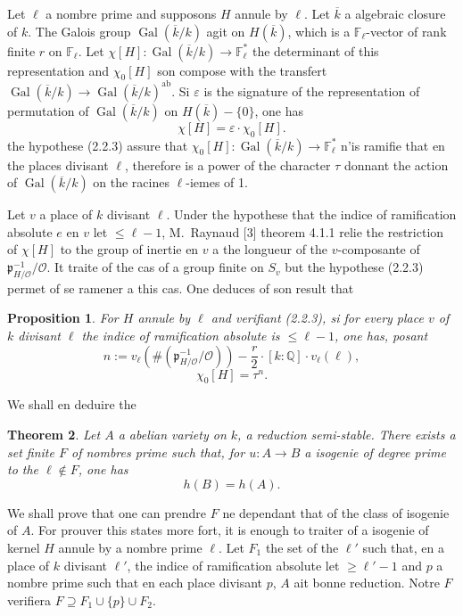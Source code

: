 \documentclass[12pt,a4paper]{article}
\theoremstyle{plain}
\newtheorem{theorem}{Theorem}[section]
\newtheorem{proposition}[theorem]{Proposition}
\theoremstyle{definition}
\theoremstyle{remark}
\DeclareMathOperator{\Gal}{Gal}
\newcommand{\QQ}{\mathbb{Q}}
\newcommand{\FF}{\mathbb{F}}
\newcommand{\cO}{\mathcal{O}}
\providecommand{\FF}{\mathbb{F}}
\providecommand{\QQ}{\mathbb{Q}}
\providecommand{\cO}{\mathcal{O}}
\providecommand{\Gal}{\operatorname{Gal}}
\providecommand{\fp}{\mathfrak{p}}
\begin{document}
Let $\ell$ a nombre prime and supposons $H$ annule by $\ell$. Let $\overline{k}$ a algebraic closure of $k$. The Galois group $\Gal(\overline{k}/k)$ agit on $H(\overline{k})$, which is a $\FF_\ell$-vector of rank finite $r$ on $\FF_\ell$. Let $\chi[H] : \Gal(\overline{k}/k) \to \FF_\ell^*$ the determinant of this representation and $\chi_0[H]$ son compose with the transfert $\Gal(\overline{k}/k) \to \Gal(\overline{k}/k)^{\text{ab}}$. Si $\varepsilon$ is the signature of the representation of permutation of $\Gal(\overline{k}/k)$ on $H(\overline{k}) - \{0\}$, one has
\[
\chi[H] = \varepsilon \cdot \chi_0[H]. \tag{2.2.4}
\]
the hypothese (2.2.3) assure that $\chi_0[H] : \Gal(\overline{k}/k) \to \FF_\ell^*$ n'is ramifie that en the places divisant $\ell$, therefore is a power of the character $\tau$ donnant the action of $\Gal(\overline{k}/k)$ on the racines $\ell$-iemes of 1.

Let $v$ a place of $k$ divisant $\ell$. Under the hypothese that the indice of ramification absolute $e$ en $v$ let $\leq \ell - 1$, M.~Raynaud [3] theorem 4.1.1 relie the restriction of $\chi[H]$ to the group of inertie en $v$ a the longueur of the $v$-composante of $\fp_{H/\cO}^{-1}/\cO$. It traite of the cas of a group finite on $S_v$ but the hypothese (2.2.3) permet of se ramener a this cas. One deduces of son result that

\begin{proposition}
For $H$ annule by $\ell$ and verifiant (2.2.3), si for every place $v$ of $k$ divisant $\ell$ the indice of ramification absolute is $\leq \ell - 1$, one has, posant
\[
n := v_\ell(\#(\fp_{H/\cO}^{-1}/\cO)) - \frac{r}{2} \cdot [k:\QQ] \cdot v_\ell(\ell),
\]
\[
\chi_0[H] = \tau^n.
\]
\end{proposition}

We shall en deduire the

\begin{theorem}
Let $A$ a abelian variety on $k$, a reduction semi-stable. There exists a set finite $F$ of nombres prime such that, for $u : A \to B$ a isogenie of degree prime to the $\ell \notin F$, one has
\[
h(B) = h(A). \tag{2.4.1}
\]
\end{theorem}

We shall prove that one can prendre $F$ ne dependant that of the class of isogenie of $A$. For prouver this states more fort, it is enough to traiter of a isogenie of kernel $H$ annule by a nombre prime $\ell$. Let $F_1$ the set of the $\ell'$ such that, en a place of $k$ divisant $\ell'$, the indice of ramification absolute let $\geq \ell' - 1$ and $p$ a nombre prime such that en each place divisant $p$, $A$ ait bonne reduction. Notre $F$ verifiera $F \supseteq F_1 \cup \{p\} \cup F_2$.
\end{document}
